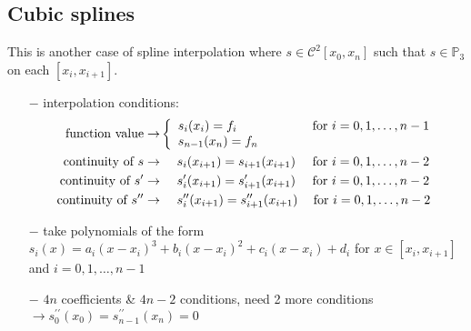 \documentclass[11pt]{article}
\theoremstyle{definition}
\newcommand{\PP}{\mathbb{P}}
\newcommand{\C}{\mathcal{C}}
\begin{document}
\subsection{Cubic splines}
This is another case of spline interpolation where $s\in\C^2[x_0,x_n]$ such that $s\in\PP_3$ on each $[x_{i},x_{i+1}]$.
\vspace{-8mm}
\begin{itemize}
	\itemsep0em
	\item[$-$] interpolation conditions:
	\vspace{-3.5mm}
	\begin{align*}
		\text{function value}\rightarrow &\left\lbrace\begin{array}{l}
		s_i(x_i)=f_i\text{ }\text{ }\text{ }\text{ }\text{ }\text{ }\text{ }\text{ }\text{ }\text{ }\text{ }\text{ }\text{ }\text{ }\text{ }\text{ }\hspace{1mm}\text{ for }i=0,1,\dots,n-1\\
		s_{n-1}(x_n)=f_n
	\end{array}\right.\\
	\text{continuity of }s\rightarrow & \text{ }\text{ }\text{ }\text{ }s_i(x_{i+1})=s_{i+1}(x_{i+1})\text{ }\text{ }\text{ }\text{ for }i=0,1,\dots,n-2\\
	\text{continuity of }s^{\prime}\rightarrow & \text{ }\text{ }\text{ }\text{ }s_i^{\prime}(x_{i+1})=s_{i+1}^{\prime}(x_{i+1})\text{ }\text{ }\text{ }\text{ for }i=0,1,\dots,n-2\\
	\text{continuity of }s^{\prime\prime}\rightarrow &  \text{ }\text{ }\text{ }\text{ }s_i^{\prime\prime}(x_{i+1})=s_{i+1}^{\prime\prime}(x_{i+1})\text{ }\hspace{2mm}\text{ for }i=0,1,\dots,n-2
	\end{align*}
	\vspace{-7mm}
	\item[$-$] take polynomials of the form $s_i(x)=a_i(x-x_i)^3+b_i(x-x_i)^2+c_i(x-x_i)+d_i$ for $x\in[x_{i},x_{i+1}]$ and $i=0,1,\dots,n-1$
	\item[$-$] $4n$ coefficients \& $4n-2$ conditions, need 2 more conditions $\rightarrow s_0^{\prime\prime}(x_0)=s_{n-1}^{\prime\prime}(x_n)=0$
\end{itemize}
\vspace{-2mm}
\end{document}
